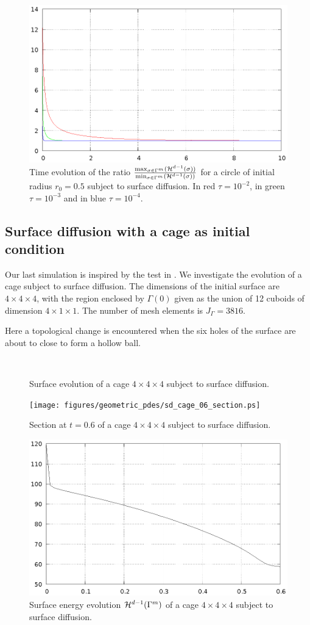 \begin{figure}[htbp]
\centering
\includegraphics[width=.45\textwidth]
{figures/geometric_pdes/sd_circle_tau.ps}
\caption{Time evolution of the ratio
$\frac{\max_{\sigma\in \Gamma^m}(\mathcal{H}^{d-1}(\sigma))}
{\min_{\sigma\in\Gamma^m}(\mathcal{H}^{d-1}(\sigma))}$ for a circle of initial radius
$r_0=0.5$ subject to surface diffusion. In red $\tau=10^{-2}$, in green
$\tau=10^{-3}$ and in blue $\tau=10^{-4}$.}
\label{fig:sd_circle_tau}
\end{figure}

\subsection[Surface diffusion with a cage as initial condition]{Surface
diffusion with a cage as initial condition}
Our last simulation is inspired by the test in \cite[Fig.~15]{BGN2008}. We
investigate the evolution of a cage subject to surface diffusion. The
dimensions of the initial surface are $4 \times 4 \times 4$, with the region
enclosed by $\Gamma(0)$ given as the union of 12 cuboids of dimension $4 \times
1 \times 1$. The number of mesh elements is $J_\Gamma=3816$.

Here a topological change is encountered when the six holes of the
surface are about to close to form a hollow ball.

\begin{figure}[htbp]
\centering
{}
\quad
{}
\\
\quad
{}
\caption{Surface evolution of a cage $4 \times 4 \times 4$ subject to surface
diffusion.}
\label{fig:sd_cage}
\end{figure}

\begin{figure}[htbp]
\centering
\texttt{[image: figures/geometric\_pdes/sd\_cage\_06\_section.ps]}
\caption{Section at $t=0.6$ of a cage $4 \times 4 \times 4$ subject to surface
diffusion.}
\label{fig:sd_cage_section}
\end{figure}

\begin{figure}[htbp]
\centering
\includegraphics[width=.45\textwidth]
{figures/geometric_pdes/sd_cage_energy.ps}
\caption{Surface energy evolution $\mathcal{H}^{d-1}(\Gamma^m)$ of a cage $4 \times 4
\times 4$ subject to surface diffusion.}
\label{fig:sd_cage_energy}
\end{figure}
